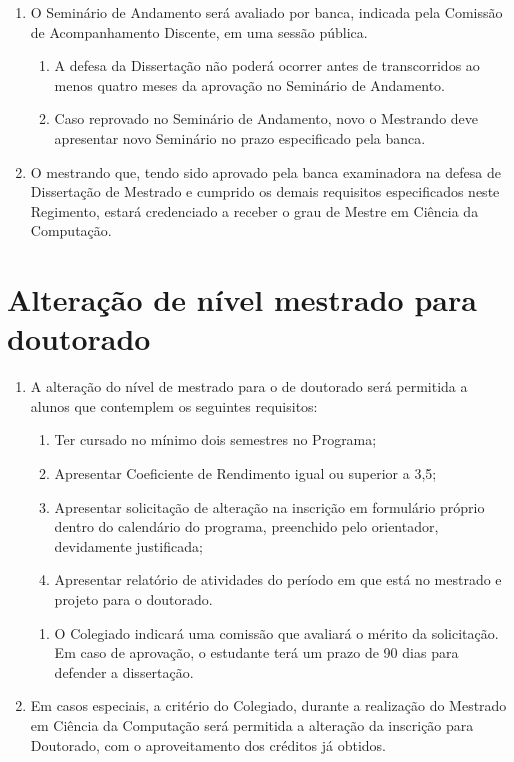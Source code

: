 \documentclass{article}
\newcommand{\singleitem}{\item[Parágrafo Único.]}
\begin{document}
\begin{enumerate}
	\item O Seminário de Andamento será avaliado por banca, indicada pela Comissão de Acompanhamento Discente, em uma sessão pública.
	\begin{enumerate}
		\item A defesa da Dissertação não poderá ocorrer antes de transcorridos ao menos quatro meses da aprovação no Seminário de Andamento.
		\item Caso reprovado no Seminário de Andamento, novo o Mestrando deve apresentar novo Seminário no prazo especificado pela banca.
	\end{enumerate}

	\item O mestrando que, tendo sido aprovado pela banca examinadora na defesa de Dissertação de Mestrado e cumprido os demais requisitos especificados neste Regimento, estará credenciado a receber o grau de Mestre em Ciência da Computação.

\end{enumerate}

\section{Alteração de nível mestrado para doutorado}
\begin{enumerate}
	\item  A alteração do nível de mestrado para o de doutorado será permitida a alunos que contemplem os seguintes requisitos:
	\begin{enumerate}[label=\Roman*]
		\item Ter cursado no mínimo dois semestres no Programa;

		\item Apresentar Coeficiente de Rendimento igual ou superior a 3,5;

		\item Apresentar solicitação de alteração na inscrição em formulário próprio dentro do calendário do programa, preenchido pelo orientador, devidamente justificada;

		\item Apresentar relatório de atividades do período em que está no mestrado e projeto para o doutorado.
	\end{enumerate}

	\begin{enumerate}
		\singleitem O Colegiado indicará uma comissão que avaliará o mérito da solicitação. Em caso de aprovação, o estudante terá um prazo de 90 dias para defender a dissertação.
	\end{enumerate}

	\item Em casos especiais, a critério do Colegiado, durante a realização do Mestrado em Ciência da Computação será permitida a alteração da inscrição para Doutorado, com o aproveitamento dos créditos já obtidos.	

\end{enumerate}
\end{document}

